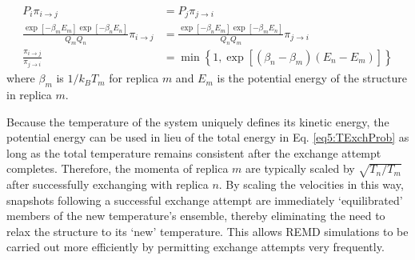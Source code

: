 \begin{align}
   P_{i} \pi_{i \rightarrow j} & = P_{j} \pi_{j \rightarrow i} \nonumber \\
   \frac {\exp \left[ -\beta_m E_m \right] \exp \left[ -\beta_n E_n \right]}
         {Q_m Q_n} \pi_{i \rightarrow j} & = \frac {\exp \left[ -\beta_n E_m
         \right] \exp \left[ -\beta_m E_n \right]} {Q_n Q_m} \pi_{j \rightarrow
         i} \nonumber \\
   \frac {\pi_{i \rightarrow j}} {\pi_{j \rightarrow i}} & = \min \left \lbrace
         1, \exp \left[ (\beta_n - \beta_m) (E_n - E_m) \right] \right \rbrace
   \label{eq5:TExchProb}
\end{align}
where $\beta_m$ is $1/k_BT_m$ for replica $m$ and $E_m$ is the potential energy
of the structure in replica $m$.

Because the temperature of the system uniquely defines its kinetic energy, the
potential energy can be used in lieu of the total energy in Eq.
\ref{eq5:TExchProb} as long as the total temperature remains consistent after
the exchange attempt completes. Therefore, the momenta of replica $m$ are
typically scaled by $\sqrt{T_n/T_m}$ after successfully exchanging with replica
$n$. \cite{Sugita_ChemPhysLett_1999_v314_p141} By scaling the velocities in this
way, snapshots following a successful exchange attempt are immediately
`equilibrated' members of the new temperature's ensemble, thereby eliminating
the need to relax the structure to its `new' temperature. This allows REMD
simulations to be carried out more efficiently by permitting exchange attempts
very frequently. \cite{Sindhikara2008, Sindhikara2010}

